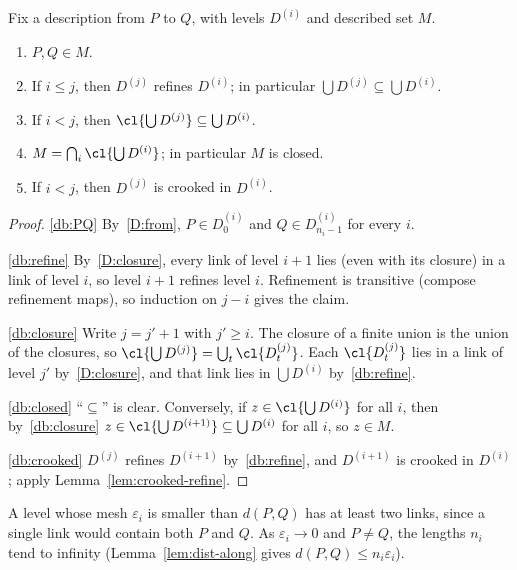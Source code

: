 Fix a description from $P$ to $Q$, with levels $D^{(i)}$ and described set $M$.

\begin{lemma}\label{lem:desc-basic}
\begin{enumerate}[label=(\alph*)]
\item\label{db:PQ} $P,Q\in M$.
\item\label{db:refine} If $i\le j$, then $D^{(j)}$ refines $D^{(i)}$; in particular
$\bigcup D^{(j)}\subseteq\bigcup D^{(i)}$.
\item\label{db:closure} If $i<j$, then $\cl{\bigcup D^{(j)}}\subseteq\bigcup D^{(i)}$.
\item\label{db:closed} $M=\bigcap_i\cl{\bigcup D^{(i)}}$; in particular $M$ is closed.
\item\label{db:crooked} If $i<j$, then $D^{(j)}$ is crooked in $D^{(i)}$.
\end{enumerate}
\end{lemma}

\begin{proof}
\ref{db:PQ} By~\ref{D:from}, $P\in D^{(i)}_0$ and $Q\in D^{(i)}_{n_i-1}$ for every $i$.

\ref{db:refine} By~\ref{D:closure}, every link of level $i+1$ lies (even with its closure) in a
link of level $i$, so level $i+1$ refines level $i$. Refinement is transitive (compose
refinement maps), so induction on $j-i$ gives the claim.

\ref{db:closure} Write $j=j'+1$ with $j'\ge i$. The closure of a finite union is the union of
the closures, so
$\cl{\bigcup D^{(j)}}=\bigcup_t\cl{D^{(j)}_t}$. Each $\cl{D^{(j)}_t}$ lies in a link of level
$j'$ by~\ref{D:closure}, and that link lies in $\bigcup D^{(i)}$ by~\ref{db:refine}.

\ref{db:closed} ``$\subseteq$'' is clear. Conversely, if $z\in\cl{\bigcup D^{(i)}}$ for all $i$,
then by~\ref{db:closure} $z\in\cl{\bigcup D^{(i+1)}}\subseteq\bigcup D^{(i)}$ for all $i$, so
$z\in M$.

\ref{db:crooked} $D^{(j)}$ refines $D^{(i+1)}$ by~\ref{db:refine}, and $D^{(i+1)}$ is crooked in
$D^{(i)}$; apply Lemma~\ref{lem:crooked-refine}.
\end{proof}


\begin{remark}
A level whose mesh $\varepsilon_i$ is smaller than $d(P,Q)$ has at least two links, since a single
link would contain both $P$ and $Q$. As $\varepsilon_i\to0$ and $P\neq Q$, the lengths $n_i$ tend
to infinity (Lemma~\ref{lem:dist-along} gives $d(P,Q)\le n_i\varepsilon_i$).
\end{remark}

